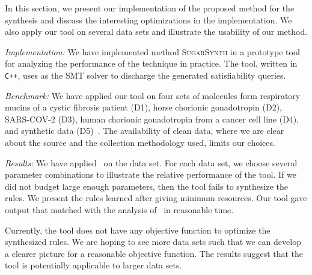 In this section, we  present our implementation of the proposed method for the synthesis
and discuss the interesting optimizations in the implementation.
%
We also apply our tool on several data sets and illustrate the usability of our method.

{\em Implementation:} 
We have implemented method \textsc{SugarSynth} in a prototype tool {\ourtool} for
analyzing the performance of the technique in practice.
%
The tool, written in {\tt C++}, uses {\zthree}\cite{z3} as the SMT solver
to discharge the generated satisfiability queries.
%


{\em Benchmark: }
We have applied our tool on four sets of molecules form
respiratory mucins of a cystic fibrosis patient (D1),
horse chorionic gonadotropin (D2),
SARS-COV-2 (D3),
human chorionic gonadotropin from a cancer cell line (D4),
and
synthetic data (D5)~\cite{Jaiman2018,SarsCov2}.
The availability of clean data, where we are clear about the source and the collection
methodology used, limits our choices.



{\em Results:} We have applied \ourtool~on the data set. For each data set, we choose several
parameter combinations to illustrate the relative performance of the tool.
If we did not budget large enough parameters, then the tool fails to
synthesize the rules.
We present the rules learned after giving minimum resources.
Our tool gave output that matched with the analysis of~\cite{Jaiman2018}
in reasonable time.

Currently, the tool does not have any objective function to optimize the synthesized rules.
We are hoping to see more data sets such that we can develop a clearer picture
for a reasonable objective function.
The results suggest that the tool is potentially applicable to larger data sets.



